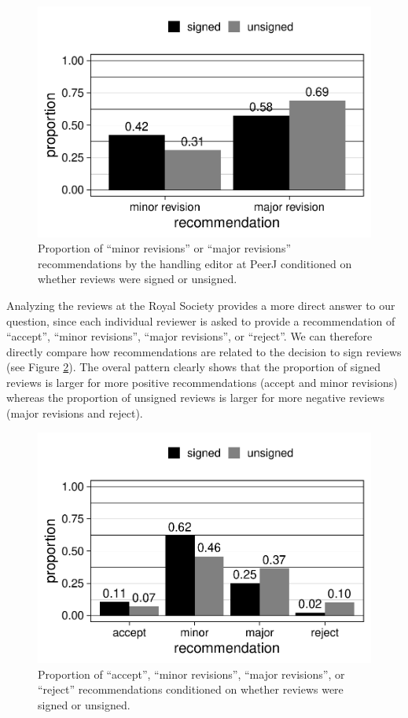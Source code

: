 \documentclass[,jou, a4paper,floatsintext]{apa6}
\begin{document}
\begin{figure}
\centering
\includegraphics{open_peer_review_files/figure-latex/PeerJrec-1.pdf}
\caption{\label{fig:PeerJrec}Proportion of \enquote{minor revisions} or \enquote{major revisions} recommendations by the handling editor at PeerJ conditioned on whether reviews were signed or unsigned.}
\end{figure}

Analyzing the reviews at the Royal Society provides a more direct answer to our question, since each individual reviewer is asked to provide a recommendation of \enquote{accept}, \enquote{minor revisions}, \enquote{major revisions}, or \enquote{reject}. We can therefore directly compare how recommendations are related to the decision to sign reviews (see Figure \ref{fig:TRSrec}). The overal pattern clearly shows that the proportion of signed reviews is larger for more positive recommendations (accept and minor revisions) whereas the proportion of unsigned reviews is larger for more negative reviews (major revisions and reject).

\begin{figure}
\centering
\includegraphics{open_peer_review_files/figure-latex/TRSrec-1.pdf}
\caption{\label{fig:TRSrec}Proportion of \enquote{accept}, \enquote{minor revisions}, \enquote{major revisions}, or \enquote{reject} recommendations conditioned on whether reviews were signed or unsigned.}
\end{figure}
\end{document}
